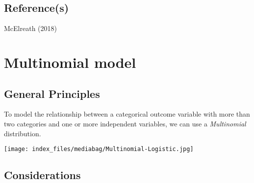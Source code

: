 \documentclass[
  letterpaper,
  DIV=11,
  numbers=noendperiod]{scrreprt}
\begin{document}
\section{Reference(s)}\label{references-7}

McElreath (2018)


\chapter{Multinomial model}\label{multinomial-model}

\section{General Principles}\label{general-principles-8}

To model the relationship between a categorical outcome variable with
more than two categories and one or more independent variables, we can
use a \emph{Multinomial} distribution.

\texttt{[image: index\_files/mediabag/Multinomial-Logistic.jpg]}

\section{Considerations}\label{considerations-8}
\end{document}
